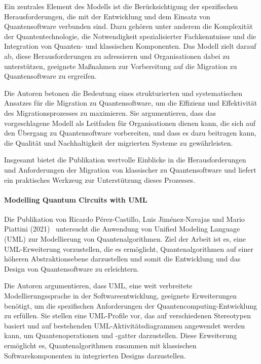 Ein zentrales Element des Modells ist die Berücksichtigung der spezifischen Herausforderungen, die mit der 
Entwicklung und dem Einsatz von Quantensoftware verbunden sind. Dazu gehören unter anderem die Komplexität der 
Quantentechnologie, die Notwendigkeit spezialisierter Fachkenntnisse und die Integration von Quanten- und 
klassischen Komponenten. Das Modell zielt darauf ab, diese Herausforderungen zu adressieren und Organisationen 
dabei zu unterstützen, geeignete Maßnahmen zur Vorbereitung auf die Migration zu Quantensoftware zu ergreifen.

Die Autoren betonen die Bedeutung eines strukturierten und systematischen Ansatzes für die Migration zu 
Quantensoftware, um die Effizienz und Effektivität des Migrationsprozesses zu maximieren. Sie argumentieren, dass 
das vorgeschlagene Modell als Leitfaden für Organisationen dienen kann, die sich auf den Übergang zu 
Quantensoftware vorbereiten, und dass es dazu beitragen kann, die Qualität und Nachhaltigkeit der 
migrierten Systeme zu gewährleisten.

Insgesamt bietet die Publikation wertvolle Einblicke in die Herausforderungen und Anforderungen der Migration 
von klassischer zu Quantensoftware und liefert ein praktisches Werkzeug zur Unterstützung dieses Prozesses.

\paragraph{Modelling Quantum Circuits with UML}

Die Publikation von Ricardo Pérez-Castillo, Luis Jiménez-Navajas und Mario Piattini (2021)~\cite{Perez-Castillo_2021} untersucht die Anwendung 
von Unified Modeling Language (UML) zur Modellierung von Quantenalgorithmen. Ziel der Arbeit ist es, eine 
UML-Erweiterung vorzustellen, die es ermöglicht, Quantenalgorithmen auf einer höheren Abstraktionsebene 
darzustellen und somit die Entwicklung und das Design von Quantensoftware zu erleichtern.

Die Autoren argumentieren, dass UML, eine weit verbreitete Modellierungssprache in der Softwareentwicklung, 
geeignete Erweiterungen benötigt, um die spezifischen Anforderungen der Quantencomputing-Entwicklung zu erfüllen. 
Sie stellen eine UML-Profile vor, das auf verschiedenen Stereotypen basiert und auf bestehenden UML-Aktivitätsdiagrammen 
angewendet werden kann, um Quantenoperationen und -gatter darzustellen. Diese Erweiterung ermöglicht es, 
Quantenalgorithmen zusammen mit klassischen Softwarekomponenten in integrierten Designs darzustellen.


